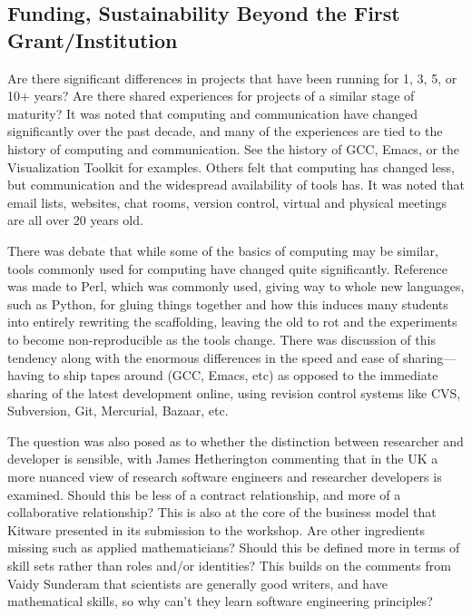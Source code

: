 \documentclass[11pt, oneside]{amsart}
\begin{document}
\subsection{Funding, Sustainability Beyond the First Grant/Institution}

Are there significant differences in projects that have been running for 1, 3,
5, or 10+ years? Are there shared experiences for projects of a similar stage
of maturity? It was noted that computing and communication have changed
significantly over the past decade, and many of the experiences are tied to
the history of computing and communication. See the history of GCC, Emacs, or
the Visualization Toolkit for examples. Others felt that computing has changed
less, but communication and the widespread availability of tools has. It was
noted that email lists, websites, chat rooms, version control, virtual and
physical meetings are all over 20 years old.

There was debate that while some of the basics of computing may be 
similar, tools commonly used for computing have changed quite
significantly. Reference was made to Perl, which was commonly used, giving way
to whole new languages, such as Python, for gluing things together and how this
induces many students into entirely rewriting the scaffolding, leaving the old
to rot and the experiments to become non-reproducible as the tools change.
 There was
discussion of this tendency along with the enormous differences in the speed and
ease of sharing---having to ship tapes around (GCC, Emacs, etc) as opposed to
the immediate sharing of the latest development online, using revision control
systems like CVS, Subversion, Git, Mercurial, Bazaar, etc.

The question was also posed as to whether the distinction between researcher
and developer is sensible, with James Hetherington commenting that in the UK
a more nuanced view of research software engineers
and researcher developers is examined. Should this be less of a contract relationship, and
more of a collaborative relationship? This is also at the core of the business
model that Kitware presented in its submission to the workshop. Are other
ingredients missing such as applied mathematicians? Should this be defined more
in terms of skill sets rather than roles and/or identities? This builds on the
comments from Vaidy Sunderam that scientists are generally good writers, and
have mathematical skills, so why can't they learn software engineering
principles?
\end{document}
